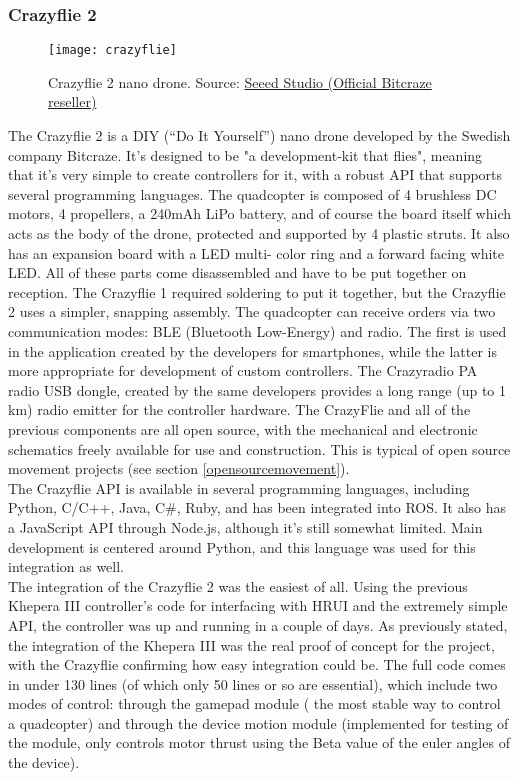\subsubsection{Crazyflie 2}  \label{crazyflie2}
\begin{figure}[H]
\centering
\texttt{[image: crazyflie]}
\caption{Crazyflie 2 nano drone. Source: \href{http://www.seeedstudio.com/depot/Crazyflie-20-p-2103.html}{Seeed Studio (Official Bitcraze reseller)}}
\end{figure}
The Crazyflie 2 is a DIY (``Do It Yourself'') nano drone developed by the Swedish company Bitcraze. It's designed to be 
"a development-kit that flies", meaning that it's very simple to create controllers for it, with a robust API that supports several
programming languages. The quadcopter is composed of 4 brushless DC motors, 4 propellers, a 240mAh LiPo battery, and of course the board
itself which acts as the body of the drone, protected and supported by 4 plastic struts. It also has an expansion board with a LED multi-
color ring and a forward facing white LED. All of these parts come disassembled and have to be put together on reception. The Crazyflie 
1 required soldering to put it together, but the Crazyflie 2 uses a simpler, snapping assembly. The quadcopter can receive orders via 
two communication modes: BLE (Bluetooth Low-Energy) and radio. The first is used in the application created by the developers for 
smartphones, while the latter is more appropriate for development of custom controllers. The Crazyradio PA radio USB dongle, created by 
the same developers provides a long range (up to 1 km) radio emitter for the controller hardware. The CrazyFlie and all of the previous 
components are all open source, with the mechanical and electronic schematics freely available for use and construction. This is typical 
of open source movement projects (see section \ref{opensourcemovement}).\\

The Crazyflie API is available in several programming languages, including Python, C/C++, Java, C\#, Ruby, and has been integrated into 
ROS. It also has a JavaScript API through Node.js, although it's still somewhat limited. Main development is centered around Python, and 
this language was used for this integration as well.\\

The integration of the Crazyflie 2 was the easiest of all. Using the previous Khepera III controller's code for interfacing with HRUI 
and the extremely simple API, the controller was up and running in a couple of days. As previously stated, the integration of the 
Khepera III was the real proof of concept for the project, with the Crazyflie confirming how easy integration could be. The full code 
comes in under 130 lines (of which only 50 lines or so are essential), which include two modes of control: through the gamepad module (
the most stable way to control a quadcopter) and through the device motion module (implemented for testing of the module, only controls 
motor thrust using the Beta value of the euler angles of the device).\\

